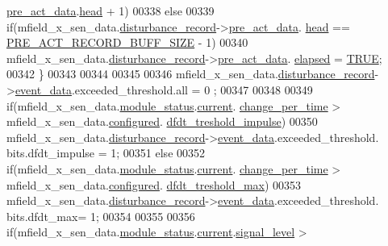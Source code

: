 \begin{DoxyCode}
      \hyperlink{a00028_aab01e8da056827bc5c9caff9b64c78be}{pre\_act\_data}.\hyperlink{a00022_a15a6827ccabba1c22396eccc1c5c654b}{head} + 1)%
00338     \textcolor{keywordflow}{else}
00339     \textcolor{keywordflow}{if}(mfield\_x\_sen\_data.\hyperlink{a00025_ac9b38e2c1d3f1013a88d33506c754152}{disturbance\_record}->\hyperlink{a00028_aab01e8da056827bc5c9caff9b64c78be}{pre\_act\_data}.
      \hyperlink{a00022_a15a6827ccabba1c22396eccc1c5c654b}{head} == \hyperlink{a00022_a18dcecc16ded13fa622e0913e73442e6}{PRE\_ACT\_RECORD\_BUFF\_SIZE} - 1)
00340     mfield\_x\_sen\_data.\hyperlink{a00025_ac9b38e2c1d3f1013a88d33506c754152}{disturbance\_record}->\hyperlink{a00028_aab01e8da056827bc5c9caff9b64c78be}{pre\_act\_data}.
      \hyperlink{a00022_abecaedb3605e8bca8335cd81ca63025f}{elapsed} = \hyperlink{a00040_aa8cecfc5c5c054d2875c03e77b7be15d}{TRUE};
00342     \}
00343 
00344 
00345 
00346     mfield\_x\_sen\_data.\hyperlink{a00025_ac9b38e2c1d3f1013a88d33506c754152}{disturbance\_record}->\hyperlink{a00028_a8c0bda69e71ef674e60da47ad0be9ab0}{event\_data}.exceeded\_threshold.all = 0
      ;
00347 
00348 
00349     \textcolor{keywordflow}{if}(mfield\_x\_sen\_data.\hyperlink{a00025_adfab5a5d8b45a93dfb13edb24e2b80e3}{module\_status}.\hyperlink{a00019_acf41ffc11da291c2f9f0fcb02ee72b98}{current}.
      \hyperlink{a00019_a0f645dd76b41adc6a966feba8e4bff8c}{change\_per\_time} > mfield\_x\_sen\_data.\hyperlink{a00025_a94b2d1f6ea4ab334c74d24984dd27843}{configured}.
      \hyperlink{a00021_a3b9c683370c94430a4c6a9d78ce6f5ef}{dfdt\_treshold\_impulse})
00350         mfield\_x\_sen\_data.\hyperlink{a00025_ac9b38e2c1d3f1013a88d33506c754152}{disturbance\_record}->\hyperlink{a00028_a8c0bda69e71ef674e60da47ad0be9ab0}{event\_data}.exceeded\_threshold.
      bits.dfdt\_impulse = 1;
00351     \textcolor{keywordflow}{else}
00352     \textcolor{keywordflow}{if}(mfield\_x\_sen\_data.\hyperlink{a00025_adfab5a5d8b45a93dfb13edb24e2b80e3}{module\_status}.\hyperlink{a00019_acf41ffc11da291c2f9f0fcb02ee72b98}{current}.
      \hyperlink{a00019_a0f645dd76b41adc6a966feba8e4bff8c}{change\_per\_time}  > mfield\_x\_sen\_data.\hyperlink{a00025_a94b2d1f6ea4ab334c74d24984dd27843}{configured}.
      \hyperlink{a00021_adf9a37828e447378b1d533185213316d}{dfdt\_treshold\_max})
00353          mfield\_x\_sen\_data.\hyperlink{a00025_ac9b38e2c1d3f1013a88d33506c754152}{disturbance\_record}->\hyperlink{a00028_a8c0bda69e71ef674e60da47ad0be9ab0}{event\_data}.exceeded\_threshold.
      bits.dfdt\_max= 1;
00354 
00355 
00356     \textcolor{keywordflow}{if}(mfield\_x\_sen\_data.\hyperlink{a00025_adfab5a5d8b45a93dfb13edb24e2b80e3}{module\_status}.\hyperlink{a00019_acf41ffc11da291c2f9f0fcb02ee72b98}{current}.\hyperlink{a00019_a4070db8eab0ff93e3fbc1df59872f117}{signal\_level} > 

\end{DoxyCode}
